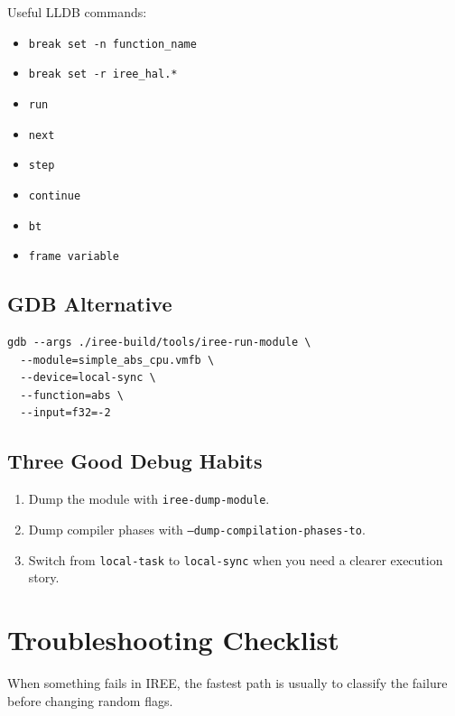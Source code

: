 \documentclass[11pt,a4paper]{article}
\begin{document}
Useful LLDB commands:
\begin{itemize}
    \item \texttt{break set -n function\_name}
    \item \texttt{break set -r iree\_hal.*}
    \item \texttt{run}
    \item \texttt{next}
    \item \texttt{step}
    \item \texttt{continue}
    \item \texttt{bt}
    \item \texttt{frame variable}
\end{itemize}

\subsection{GDB Alternative}

\begin{lstlisting}[caption=Launch the runtime under GDB]
gdb --args ./iree-build/tools/iree-run-module \
  --module=simple_abs_cpu.vmfb \
  --device=local-sync \
  --function=abs \
  --input=f32=-2
\end{lstlisting}

\subsection{Three Good Debug Habits}

\begin{enumerate}
    \item Dump the module with \texttt{iree-dump-module}.
    \item Dump compiler phases with \texttt{--dump-compilation-phases-to}.
    \item Switch from \texttt{local-task} to \texttt{local-sync} when you need a clearer execution story.
\end{enumerate}

\section{Troubleshooting Checklist}

When something fails in IREE, the fastest path is usually to classify the failure before changing random flags.
\end{document}
